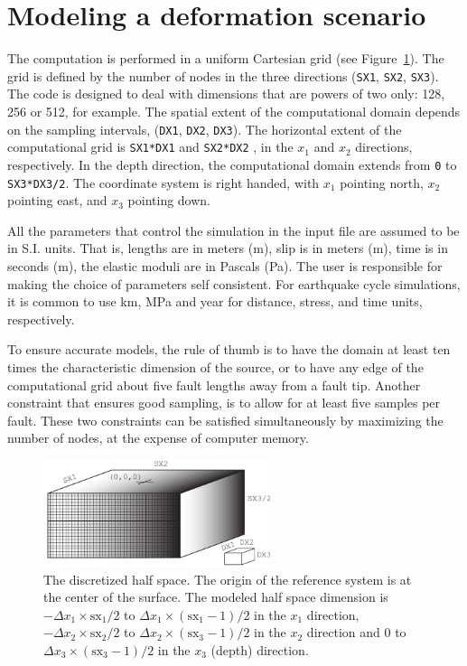 \documentclass[10pt]{article}
\begin{document}
\section{Modeling a deformation scenario}

The computation is performed in a uniform Cartesian grid (see Figure~\ref{fig:computation_grid}). The grid is defined by the number of nodes in the three directions (\verb'SX1', \verb'SX2', \verb'SX3'). The code is designed to deal with dimensions that are powers of two only: 128, 256 or 512, for example. The spatial extent of the computational domain depends on the sampling intervals, (\verb'DX1', \verb'DX2', \verb'DX3'). The horizontal extent of the computational grid is \verb'SX1*DX1' and \verb'SX2*DX2' , in the $x_1$ and $x_2$ directions, respectively. In the depth direction, the computational domain extends from \verb'0' to \verb'SX3*DX3/2'. The coordinate system is right handed, with $x_1$ pointing north, $x_2$ pointing east, and $x_3$ pointing down. 

All the parameters that control the simulation in the input file are assumed to be in S.I. units. That is, lengths are in meters (m), slip is in meters (m), time is in seconds (m), the elastic moduli are in Pascals (Pa). The user is responsible for making the choice of parameters self consistent. For earthquake cycle simulations, it is common to use km, MPa and year for distance, stress, and time units, respectively.

To ensure accurate models, the rule of thumb is to have the domain at least ten times the characteristic dimension of the source, or to have any edge of the computational grid about five fault lengths away from a fault tip. Another constraint that ensures good sampling, is to allow for at least five samples per fault. These two constraints can be satisfied simultaneously by maximizing the number of nodes, at the expense of computer memory.
%
\begin{figure}[h]
\centering\includegraphics[width=0.6\textwidth]{computational_grid.pdf}
\caption{The discretized half space. The origin of the reference system is at the center of the surface. The modeled half space dimension is $-\Delta x_1\times\text{sx}_1/2$ to $\Delta x_1\times(\text{sx}_1-1)/2$ in the $x_1$ direction, $-\Delta x_2\times\text{sx}_2/2$ to $\Delta x_2\times(\text{sx}_3-1)/2$ in the $x_2$ direction and $0$ to $\Delta x_3\times(\text{sx}_3-1)/2$ in the $x_3$ (depth) direction.}
\label{fig:computation_grid}
\end{figure}
%
\end{document}
